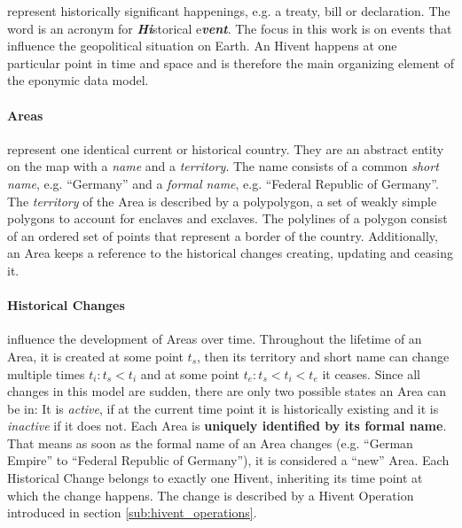 represent historically significant happenings, e.g. a treaty, bill or declaration.
The word is an acronym for \emph{\textbf{Hi}}storical e\emph{\textbf{vent}}.
The focus in this work is on events that influence the geopolitical situation on Earth.
An Hivent happens at one particular point in time and space and is therefore the main organizing element of the eponymic data model.


\vspace{-1em}
\paragraph{Areas} %
\label{par:area}

represent one identical current or historical country. They are an abstract entity on the map with a \emph{name} and a \emph{territory}. The name consists of a common \emph{short name}, e.g. ``Germany'' and a \emph{formal name}, e.g. ``Federal Republic of Germany''. The \emph{territory} of the Area is described by a polypolygon, a set of weakly simple polygons to account for enclaves and exclaves. The polylines of a polygon consist of an ordered set of points that represent a border of the country. Additionally, an Area keeps a reference to the historical changes creating, updating and ceasing it.


\vspace{-1em}
\paragraph{Historical Changes} %
\label{par:historical_changes}

influence the development of Areas over time. Throughout the lifetime of an Area, it is created at some point $t_s$, then its territory and short name can change multiple times $t_i: t_s < t_i$ and at some point $t_e: t_s < t_i < t_e$ it ceases. Since all changes in this model are sudden, there are only two possible states an Area can be in: It is \emph{active}, if at the current time point it is historically existing and it is \emph{inactive} if it does not. Each Area is \textbf{uniquely identified by its formal name}. That means as soon as the formal name of an Area changes (e.g. ``German Empire'' to ``Federal Republic of Germany''), it is considered a ``new'' Area. Each Historical Change belongs to exactly one Hivent, inheriting its time point at which the change happens.  The change is described by a Hivent Operation introduced in section \ref{sub:hivent_operations}.

